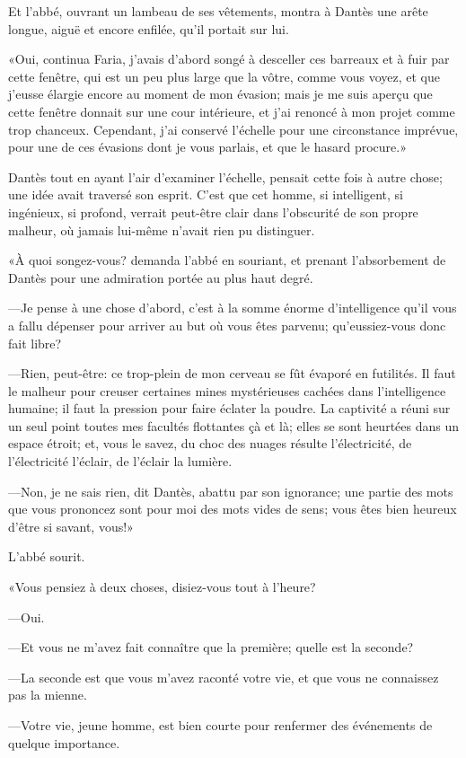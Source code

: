 Et l'abbé, ouvrant un lambeau de ses vêtements, montra à Dantès une arête longue, aiguë et encore enfilée, qu'il portait sur lui.

«Oui, continua Faria, j'avais d'abord songé à desceller ces barreaux et à fuir par cette fenêtre, qui est un peu plus large que la vôtre, comme vous voyez, et que j'eusse élargie encore au moment de mon évasion; mais je me suis aperçu que cette fenêtre donnait sur une cour intérieure, et j'ai renoncé à mon projet comme trop chanceux. Cependant, j'ai conservé l'échelle pour une circonstance imprévue, pour une de ces évasions dont je vous parlais, et que le hasard procure.»

Dantès tout en ayant l'air d'examiner l'échelle, pensait cette fois à autre chose; une idée avait traversé son esprit. C'est que cet homme, si intelligent, si ingénieux, si profond, verrait peut-être clair dans l'obscurité de son propre malheur, où jamais lui-même n'avait rien pu distinguer.

«À quoi songez-vous? demanda l'abbé en souriant, et prenant l'absorbement de Dantès pour une admiration portée au plus haut degré.

—Je pense à une chose d'abord, c'est à la somme énorme d'intelligence qu'il vous a fallu dépenser pour arriver au but où vous êtes parvenu; qu'eussiez-vous donc fait libre?

—Rien, peut-être: ce trop-plein de mon cerveau se fût évaporé en futilités. Il faut le malheur pour creuser certaines mines mystérieuses cachées dans l'intelligence humaine; il faut la pression pour faire éclater la poudre. La captivité a réuni sur un seul point toutes mes facultés flottantes çà et là; elles se sont heurtées dans un espace étroit; et, vous le savez, du choc des nuages résulte l'électricité, de l'électricité l'éclair, de l'éclair la lumière.

—Non, je ne sais rien, dit Dantès, abattu par son ignorance; une partie des mots que vous prononcez sont pour moi des mots vides de sens; vous êtes bien heureux d'être si savant, vous!»

L'abbé sourit.

«Vous pensiez à deux choses, disiez-vous tout à l'heure?

—Oui.

—Et vous ne m'avez fait connaître que la première; quelle est la seconde?

—La seconde est que vous m'avez raconté votre vie, et que vous ne connaissez pas la mienne.

—Votre vie, jeune homme, est bien courte pour renfermer des événements de quelque importance.

